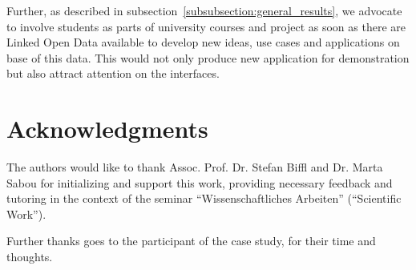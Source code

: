 Further, as described in subsection~\ref{subsubsection:general_results}, we advocate to involve students as parts of university courses and project as soon as there are Linked Open Data available to develop new ideas, use cases and applications on base of this data. This would not only produce new application for demonstration but also attract attention on the interfaces.

\section{Acknowledgments}
The authors would like to thank Assoc. Prof. Dr. Stefan Biffl and Dr. Marta Sabou for initializing and support this work, providing necessary feedback and 	tutoring in the context of the seminar ``Wissenschaftliches Arbeiten'' (``Scientific Work'').

Further thanks goes to the participant of the case study, for their time and thoughts.
